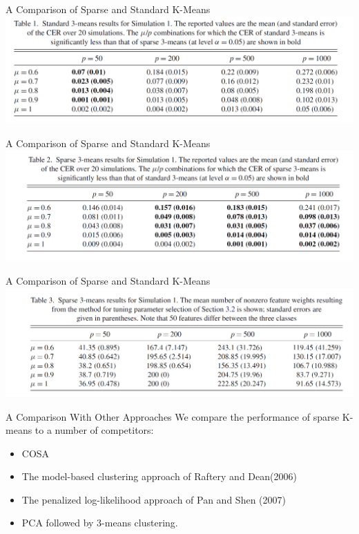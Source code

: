 \documentclass[12pt]{beamer}
\begin{document}
\begin{frame}{A Comparison of Sparse and Standard
K-Means}
\includegraphics[scale=0.6]{fig2.png} 
\end{frame}

\begin{frame}{A Comparison of Sparse and Standard
K-Means}
\includegraphics[scale=0.6]{fig3.png} 
\end{frame}

\begin{frame}{A Comparison of Sparse and Standard
K-Means}
\includegraphics[scale=0.6]{fig4.png} 
\end{frame}

\begin{frame}{A Comparison With Other Approaches}
We compare the performance of sparse K-means to a number
of competitors:
\begin{itemize}
\item COSA
\item The model-based clustering approach of Raftery
and Dean(2006)
\item The penalized log-likelihood approach of Pan and Shen
(2007)
\item PCA followed by 3-means clustering.
\end{itemize}
\end{frame}
\end{document}
